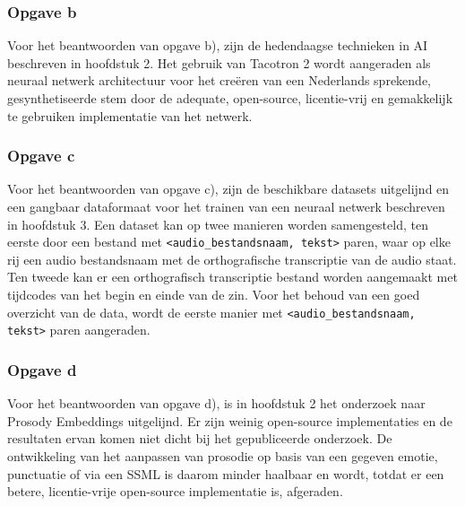 \subsubsection{Opgave b}
Voor het beantwoorden van opgave b), zijn de hedendaagse technieken in AI beschreven in hoofdstuk 2. Het gebruik van Tacotron 2 wordt aangeraden als neuraal netwerk architectuur voor het creëren van een Nederlands sprekende, gesynthetiseerde stem door de adequate, open-source, licentie-vrij en gemakkelijk te gebruiken implementatie van het netwerk.

\subsubsection{Opgave c}
Voor het beantwoorden van opgave c), zijn de beschikbare datasets uitgelijnd en een gangbaar dataformaat voor het trainen van een neuraal netwerk beschreven in hoofdstuk 3. Een dataset kan op twee manieren worden samengesteld, ten eerste door een bestand met \texttt{<audio\_bestandsnaam, tekst>} paren, waar op elke rij een audio bestandsnaam met de orthografische transcriptie van de audio staat. Ten tweede kan er een orthografisch transcriptie bestand worden aangemaakt met tijdcodes van het begin en einde van de zin. Voor het behoud van een goed overzicht van de data, wordt de eerste manier  met \texttt{<audio\_bestandsnaam, tekst>} paren aangeraden.

\subsubsection{Opgave d}
Voor het beantwoorden van opgave d), is in hoofdstuk 2 het onderzoek naar Prosody Embeddings uitgelijnd. Er zijn weinig open-source implementaties en de resultaten ervan komen niet dicht bij het gepubliceerde onderzoek. De ontwikkeling van het aanpassen van prosodie op basis van een gegeven emotie, punctuatie of via een SSML is daarom minder haalbaar en wordt, totdat er een betere, licentie-vrije open-source implementatie is, afgeraden.




